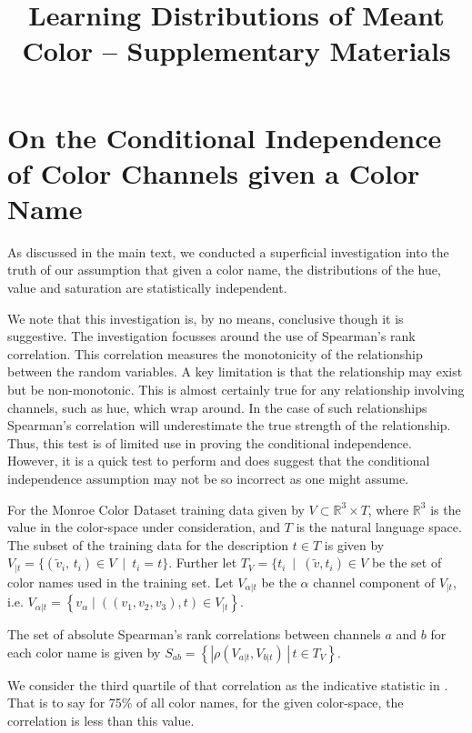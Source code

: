 \documentclass[11pt,a4paper]{article}
\title{Learning Distributions of Meant Color -- Supplementary Materials}
\author{}
\date{}
\begin{document}
\maketitle

\section{On the Conditional Independence of Color Channels given a Color Name}\label{sec:corrind}

As discussed in the main text, we conducted a superficial investigation into the truth of our assumption that given a color name, the distributions of the hue, value and saturation are statistically independent.

We note that this investigation is, by no means, conclusive though it is suggestive.
The investigation focusses around the use of Spearman's rank correlation.
This correlation measures the monotonicity of the relationship between the random variables.
A key limitation is that the relationship may exist but be non-monotonic.
This is almost certainly true for any relationship involving channels, such as hue, which wrap around.
In the case of such relationships Spearman's correlation will underestimate the true strength of the relationship.
Thus, this test is of limited use in proving the conditional independence.
However, it is a quick test to perform and does suggest that the conditional independence assumption may not be so incorrect as one might assume.


For the Monroe Color Dataset training data  given by $V \subset \mathbb{R}^{3}\times T$, where $\mathbb{R}^{3}$ is the value in the color-space under consideration, and $T$ is the natural language space.
The subset of the training data for the description $t \in T$ is given by
$V_{|t}=\{(\tilde{v}_i,\,t_i) \in V \: \mid \: t_{i}=t\}$.
Further let $T_V = \{t_i \: \mid \: (\tilde{v},t_i)\in V$ be the set of color names used in the training set.
Let $V_{\alpha|t}$ be the $\alpha$ channel component of $V_{|t}$, i.e. $V_{\alpha|t} = \left\lbrace v_\alpha \mid ((v_1,v_2,v_3), t) \in V_{|t} \right\rbrace$.

The set of absolute Spearman's rank correlations between channels $a$ and $b$ for each color name is given by
$S_{ab}=\left\lbrace \left|\rho(V_{a|t},V_{b|t})\,\right|\,t\in T_{V}\right\rbrace$.
\newpage

We consider the third quartile of that correlation as the indicative statistic in .
That is to say for 75\% of all color names, for the given color-space, the correlation is less than this value.
\end{document}
